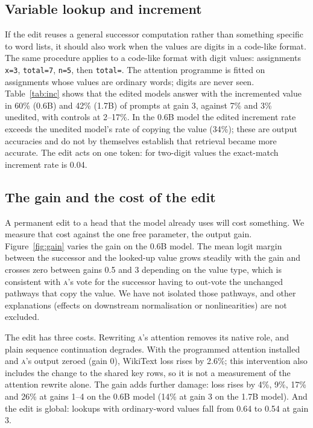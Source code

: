 \documentclass[11pt]{article}
\newcommand{\A}{\textsc{a}}
\begin{document}
\subsection{Variable lookup and increment}\label{sec:inc}

If the edit reuses a general successor computation rather than something specific to word lists, it should also work when the values are digits in a code-like format. The same procedure applies to a code-like format with digit values: assignments \texttt{x=3}, \texttt{total=7}, \texttt{n=5}, then \texttt{total=}. The attention programme is fitted on assignments whose values are ordinary words; digits are never seen. Table~\ref{tab:inc} shows that the edited models answer with the incremented value in 60\% (0.6B) and 42\% (1.7B) of prompts at gain 3, against 7\% and 3\% unedited, with controls at 2--17\%. In the 0.6B model the edited increment rate exceeds the unedited model's rate of copying the value (34\%); these are output accuracies and do not by themselves establish that retrieval became more accurate. The edit acts on one token: for two-digit values the exact-match increment rate is 0.04.

\begin{table}[t]
\centering\small

\caption{Single-digit assignments (600 prompts): fraction answered with the incremented value $v{+}1$ and with the stored value $v$.}
\label{tab:inc}
\end{table}

\subsection{The gain and the cost of the edit}\label{sec:gain}

A permanent edit to a head that the model already uses will cost something. We measure that cost against the one free parameter, the output gain. Figure~\ref{fig:gain} varies the gain on the 0.6B model. The mean logit margin between the successor and the looked-up value grows steadily with the gain and crosses zero between gains 0.5 and 3 depending on the value type, which is consistent with \A's vote for the successor having to out-vote the unchanged pathways that copy the value. We have not isolated those pathways, and other explanations (effects on downstream normalisation or nonlinearities) are not excluded.

The edit has three costs. Rewriting \A's attention removes its native role, and plain sequence continuation degrades. With the programmed attention installed and \A's output zeroed (gain 0), WikiText loss rises by 2.6\%; this intervention also includes the change to the shared key rows, so it is not a measurement of the attention rewrite alone. The gain adds further damage: loss rises by 4\%, 9\%, 17\% and 26\% at gains 1--4 on the 0.6B model (14\% at gain 3 on the 1.7B model). And the edit is global: lookups with ordinary-word values fall from 0.64 to 0.54 at gain 3.
\end{document}
